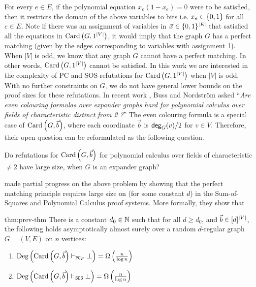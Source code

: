 \documentclass[11pt]{article}
\newcommand{\Degree}[1]{\text{Deg}\left(#1\right)}
\newcommand{\PC}{\vdash_{\texttt{PC}_F}}
\newcommand{\SOS}{\vdash_{\texttt{SOS}}}
\begin{document}
For every $e \in E$, if the polynomial equation $x_e(1 - x_e) = 0$ were to be satisfied, then it restricts the domain of the above variables to bits i.e. $x_e \in \{0,1\}$ for all $e \in E$.
Note if there was an assignment of variables in $\vec{x} \in \{0,1\}^{|E|}$ that satisfied all the equations in $\text{Card}\left(G, 1^{|V|}\right)$, it would imply that the graph $G$ has a perfect matching (given by the edges corresponding to variables with assignment 1).  
When $|V|$ is odd, we know that any graph $G$ cannot have a perfect matching.
In other words, $\text{Card}\left(G, 1^{|V|}\right)$ cannot be satisfied.
In this work we are interested in the complexity of PC and SOS refutations for $\text{Card}\left(G, 1^{|V|}\right)$  when $|V|$ is odd.
With no further constraints on $G$, we do not have general lower bounds on the proof sizes for these refutations.
In recent work \citep[Open Problem 7.7]{buss2021proof}, Buss and Nordstr{\"o}m asked ``\textit{Are even colouring formulas over expander graphs hard for
polynomial calculus over fields of characteristic distinct from 2 ?}''
The even colouring formula is a special case of $\text{Card}\left(G, \vec{b}\right)$, where each coordinate  $\vec{b}$ is $\mathsf{deg}_{G}(v)/2$ for $v \in V$.
Therefore, their open question can be reformulated as the following question.

\begin{boxedproblem}
Do refutations for $\text{Card}\left(G, \vec{b}\right)$ for
polynomial calculus over fields of characteristic $\neq 2$ have large size, when $G$ is an expander graph?
\end{boxedproblem}

\citet{Austrin_2022} made partial progress on the above problem by showing that the perfect matching principle requires large size on  (for some constant $d$) in the Sum-of-Squares and Polynomial Calculus proof systems.
More formally, they show that 

\begin{theorem}{\citep{Austrin_2022}}{thm:prev-thm}
There is a constant $d_0 \in \mathbb{N}$ such that for all $d \geq d_0$, and $\vec{b} \in [d]^{\left|V\right|}$, the following holds asymptotically almost surely over a random $d$-regular graph $G=(V,E)$ on $n$ vertices:
\begin{enumerate}
    \item{ $\Degree{\Card{G, \vec{b}} \PC \bot} = \BigOmega{\frac{n}{\log n}}$} 
    \item{$\Degree{\Card{G, \vec{b}} \SOS \bot} = \BigOmega{\frac{n}{\log n}}$}
\end{enumerate}
\end{theorem}
\end{document}
